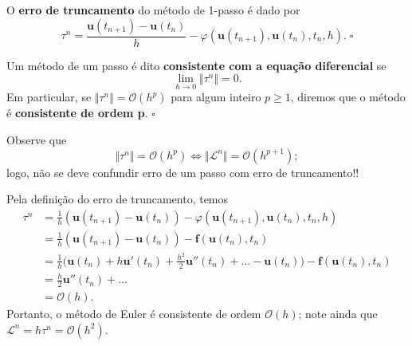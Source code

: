 \documentclass[../differential_methods.tex]{subfiles}
\begin{document}
\begin{def*}
	O \textbf{erro de truncamento} do método de 1-passo é dado por
	\[
		\tau^{n} = \frac{\mathbf{u}(t_{n+1}) - \mathbf{u}(t_{n})}{h} - \varphi (\mathbf{u}(t_{n+1}), \mathbf{u}(t_{n}), t_{n}, h).\; \square
	\]
\end{def*}
\begin{def*}
	Um método de um passo é dito \textbf{consistente com a equação diferencial} se
	\[
		\lim_{h\to 0}\Vert \tau^{n} \Vert = 0.
	\]
	Em particular, se \(\Vert \tau^{n} \Vert = \mathcal{O}(h^{p})\) para algum inteiro \(p\geq 1\), diremos que o método é \textbf{consistente de ordem p}. \(\square\)
\end{def*}
Observe que
\[
	\Vert \tau^{n} \Vert = \mathcal{O}(h^{p}) \Longleftrightarrow \Vert \mathcal{L}^{n} \Vert = \mathcal{O}(h^{p+1});
\]
logo, não se deve confundir erro de um passo com erro de truncamento!!
\begin{example}
	Pela definição do erro de truncamento, temos
	\begin{align*}
		\tau^{n} & = \frac{1}{h}(\mathbf{u}(t_{n+1}) - \mathbf{u}(t_{n})) - \varphi (\mathbf{u}(t_{n+1}), \mathbf{u}(t_{n}), t_{n}, h)                                                        \\
		         & = \frac{1}{h}(\mathbf{u}(t_{n+1}) - \mathbf{u}(t_{n})) - \mathbf{f}(\mathbf{u}(t_{n}), t_{n})                                                                              \\
		         & = \frac{1}{h}\biggl(\mathbf{u}(t_{n}) + h \mathbf{u}'(t_{n}) + \frac{h^{2}}{2}\mathbf{u}''(t_{n})+\dotsc - \mathbf{u}(t_{n})\biggr) - \mathbf{f}(\mathbf{u}(t_{n}), t_{n}) \\
		         & = \frac{h}{2}\mathbf{u}''(t_{n}) + \dotsc                                                                                                                                  \\
		         & = \mathcal{O}(h).
	\end{align*}
	Portanto, o método de Euler é consistente de ordem \(\mathcal{O}(h)\); note ainda que \(\mathcal{L}^{n} = h \tau^{n} = \mathcal{O}(h^{2})\).
\end{example}
\end{document}
